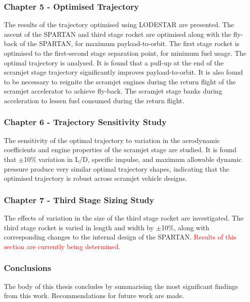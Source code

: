       \subsubsection*{Chapter 5 - Optimised Trajectory}
      
      The results of the trajectory optimised using LODESTAR are presented. The ascent of the SPARTAN and third stage rocket are optimised along with the fly-back of the SPARTAN, for maximum payload-to-orbit. The first stage rocket is optimised to the first-second stage separation point, for minimum fuel usage. The optimal trajectory is analysed. It is found that a pull-up at the end of the scramjet stage trajectory significantly improves payload-to-orbit. It is also found to be necessary to reignite the scramjet engines during the return flight of the scramjet accelerator to achieve fly-back. The scramjet stage banks during acceleration to lessen fuel consumed during the return flight.
      
      \subsubsection*{Chapter 6 - Trajectory Sensitivity Study}
      
      The sensitivity of the optimal trajectory to variation in the aerodynamic coefficients and engine properties of the scramjet stage are studied. It is found that $\pm$10\% variation in L/D, specific impulse, and maximum allowable dynamic pressure produce very similar optimal trajectory shapes, indicating that the optimised trajectory is robust across scramjet vehicle designs. 
      
      \subsubsection*{Chapter 7 - Third Stage Sizing Study}
      
      The effects of variation in the size of the third stage rocket are investigated. The third stage rocket is varied in length and width by $\pm$10\%, along with corresponding changes to the internal design of the SPARTAN. \textcolor{red}{Results of this section are currently being determined.} 
      
     
      

    \subsubsection*{Conclusions}

      The body of this thesis concludes by summarising the most significant findings from this work. Recommendations for future work are made. 